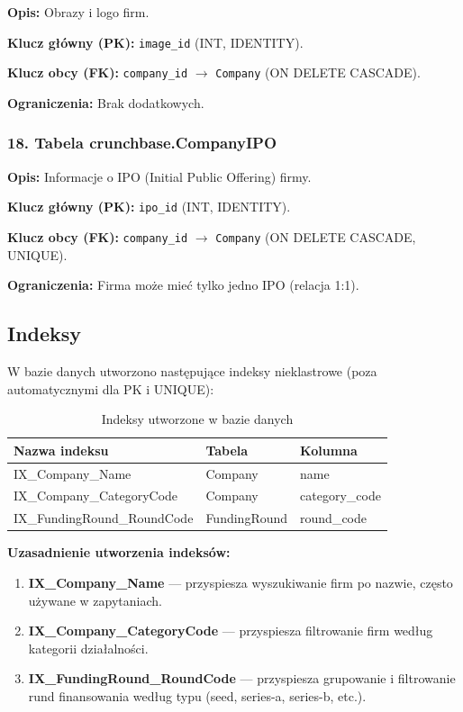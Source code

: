 \documentclass[12pt,a4paper]{article}
\begin{document}
\textbf{Opis:} Obrazy i logo firm.

\textbf{Klucz główny (PK):} \texttt{image\_id} (INT, IDENTITY).

\textbf{Klucz obcy (FK):} \texttt{company\_id} $\rightarrow$ \texttt{Company} (ON DELETE CASCADE).

\textbf{Ograniczenia:} Brak dodatkowych.

\subsubsection{18. Tabela crunchbase.CompanyIPO}

\textbf{Opis:} Informacje o IPO (Initial Public Offering) firmy.

\textbf{Klucz główny (PK):} \texttt{ipo\_id} (INT, IDENTITY).

\textbf{Klucz obcy (FK):} \texttt{company\_id} $\rightarrow$ \texttt{Company} (ON DELETE CASCADE, UNIQUE).

\textbf{Ograniczenia:} Firma może mieć tylko jedno IPO (relacja 1:1).

\subsection{Indeksy}

W bazie danych utworzono następujące indeksy nieklastrowe (poza automatycznymi dla PK i UNIQUE):

\begin{table}[H]
\centering
\caption{Indeksy utworzone w bazie danych}
\begin{tabular}{|l|l|l|}
\hline
\textbf{Nazwa indeksu} & \textbf{Tabela} & \textbf{Kolumna} \\
\hline
IX\_Company\_Name & Company & name \\
IX\_Company\_CategoryCode & Company & category\_code \\
IX\_FundingRound\_RoundCode & FundingRound & round\_code \\
\hline
\end{tabular}
\end{table}

\textbf{Uzasadnienie utworzenia indeksów:}

\begin{enumerate}[noitemsep]
    \item \textbf{IX\_Company\_Name} --- przyspiesza wyszukiwanie firm po nazwie, często używane w zapytaniach.

    \item \textbf{IX\_Company\_CategoryCode} --- przyspiesza filtrowanie firm według kategorii działalności.

    \item \textbf{IX\_FundingRound\_RoundCode} --- przyspiesza grupowanie i filtrowanie rund finansowania według typu (seed, series-a, series-b, etc.).
\end{enumerate}
\end{document}
